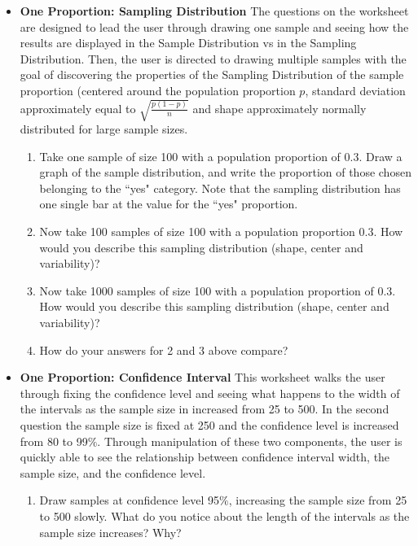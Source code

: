 \documentclass[11pt]{book}
\begin{document}
\begin{itemize}
\item {\bf One Proportion: Sampling Distribution} The questions on the worksheet are designed to lead the user through drawing one sample and seeing how the results are displayed in the Sample Distribution vs in the Sampling Distribution. Then, the user is directed to drawing multiple samples with the goal of discovering the properties of the Sampling Distribution of the sample proportion (centered around the population proportion $p$, standard deviation approximately equal to $\sqrt{\frac{p(1-p)}{n}}$ and shape approximately normally distributed for large sample sizes.

\begin{enumerate}
\item Take one sample of size 100 with a population proportion of 0.3. Draw a graph of the sample distribution, and write the proportion of those chosen belonging to the ``yes" category. Note that the sampling distribution has one single bar at the value for the ``yes" proportion.

\item Now take 100 samples of size 100 with a population proportion 0.3.  How would you describe this sampling distribution (shape, center and variability)? 

\item Now take 1000 samples of size 100 with a population proportion of 0.3.  How would you describe this sampling distribution (shape, center and variability)?  

\item How do your answers for 2 and 3 above compare?
\end{enumerate}

\item {\bf One Proportion: Confidence Interval} This worksheet walks the user through fixing the confidence level and seeing what happens to the width of the intervals as the sample size in increased from 25 to 500. In the second question the sample size is fixed at 250 and the confidence level is increased from 80 to 99$\%$.  Through manipulation of these two components, the user is quickly able to see the relationship between confidence interval width, the sample size, and the confidence level.

\begin{enumerate}
\item Draw samples at confidence level 95$\%$, increasing the sample size from 25 to 500 slowly. What do you notice about the length of the intervals as the sample size increases? Why?


\end{enumerate}
\end{itemize}
\end{document}
